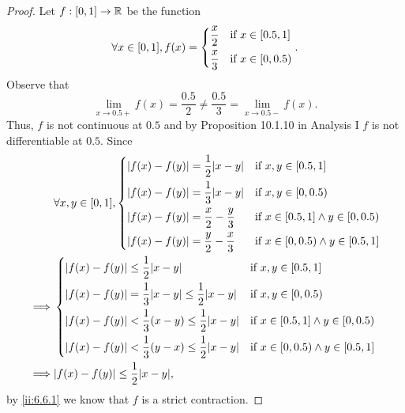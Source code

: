 \begin{proof}
  Let \(f : [0, 1] \to \mathbb{R}\) be the function
  \[
    \forall x \in [0, 1], f(x) = \begin{dcases}
      \dfrac{x}{2} & \text{if } x \in [0.5, 1] \\
      \dfrac{x}{3} & \text{if } x \in [0, 0.5)
    \end{dcases}.
  \]
  Observe that
  \[
    \lim_{x \to 0.5+} f(x) = \dfrac{0.5}{2} \neq \dfrac{0.5}{3} = \lim_{x \to 0.5-} f(x).
  \]
  Thus, \(f\) is not continuous at \(0.5\) and by Proposition 10.1.10 in Analysis I \(f\) is not differentiable at \(0.5\).
  Since
  \begin{align*}
             & \forall x, y \in [0, 1], \begin{dcases}
                                          \abs{f(x) - f(y)} = \dfrac{1}{2} \abs{x - y}    & \text{if } x, y \in [0.5, 1]                   \\
                                          \abs{f(x) - f(y)} = \dfrac{1}{3} \abs{x - y}    & \text{if } x, y \in [0, 0.5)                   \\
                                          \abs{f(x) - f(y)} = \dfrac{x}{2} - \dfrac{y}{3} & \text{if } x \in [0.5, 1] \land y \in [0, 0.5) \\
                                          \abs{f(x) - f(y)} = \dfrac{y}{2} - \dfrac{x}{3} & \text{if } x \in [0, 0.5) \land y \in [0.5, 1]
                                        \end{dcases}   \\
    \implies & \begin{dcases}
                 \abs{f(x) - f(y)} \leq \dfrac{1}{2} \abs{x - y}                            & \text{if } x, y \in [0.5, 1]                   \\
                 \abs{f(x) - f(y)} = \dfrac{1}{3} \abs{x - y} \leq \dfrac{1}{2} \abs{x - y} & \text{if } x, y \in [0, 0.5)                   \\
                 \abs{f(x) - f(y)} < \dfrac{1}{3} (x - y) \leq \dfrac{1}{2} \abs{x - y}     & \text{if } x \in [0.5, 1] \land y \in [0, 0.5) \\
                 \abs{f(x) - f(y)} < \dfrac{1}{3} (y - x) \leq \dfrac{1}{2} \abs{x - y}     & \text{if } x \in [0, 0.5) \land y \in [0.5, 1]
               \end{dcases} \\
    \implies & \abs{f(x) - f(y)} \leq \dfrac{1}{2} \abs{x - y},
  \end{align*}
  by \cref{ii:6.6.1} we know that \(f\) is a strict contraction.
\end{proof}

